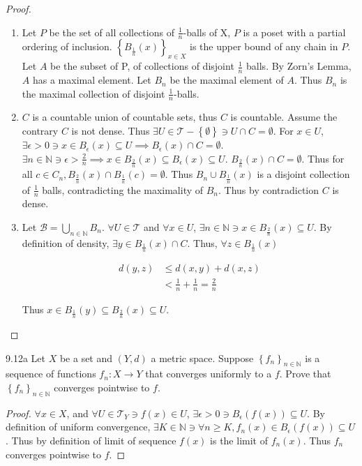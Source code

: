 \documentclass{article}
\newcommand*{\T}{\mathcal{T}}
\newcommand*{\B}{\mathcal{B}}
\newcommand*{\subeq}{\subseteq}
\newcommand*{\empset}{\emptyset}
\newcommand{\N}{\mathbb{N}}
\begin{document}
\begin{proof}
    \begin{enumerate}
        \item Let $P$ be the set of all collections of $\frac{1}{n}$-balls of X, $P$ is a poset with a partial ordering of inclusion. $\left\{ B_{\frac{1}{n}}(x) \right\}_{x \in X}$ is the upper bound of any chain in $P$. Let $A$ be the subset of P, of collections of disjoint $\frac{1}{n}$ balls. By Zorn's Lemma, $A$ has a maximal element. Let $B_n$ be the maximal element of $A$. Thus $B_n$ is the maximal collection of disjoint $\frac{1}{n}$-balls. 
        \item $C$ is a countable union of countable sets, thus $C$ is countable. Assume the contrary $C$ is not dense. Thus $\exists U \in \T - \left\{ \empset \right\}\ni U \cap C = \empset$. For $x \in U$, $\exists \epsilon > 0 \ni x \in B_{\epsilon}(x) \subeq U \implies B_{\epsilon}(x) \cap C = \empset$. $\exists n\in \N \ni \epsilon > \frac{2}{n} \implies x \in B_{\frac{2}{n}}(x) \subeq B_{\epsilon}(x) \subeq U$. $B_{\frac{2}{n}}(x) \cap C = \empset$. Thus for all $c \in C_n, B_{\frac{2}{n}}(x) \cap B_{\frac{1}{n}}(c) = \empset$. Thus $B_n \cup B_{\frac{1}{n}}(x)$ is a disjoint collection of $\frac{1}{n}$ balls, contradicting the maximality of $B_n$. Thus by contradiction $C$ is dense.       
        \item Let $\B = \bigcup_{n \in \N} B_n$. $\forall U \in \T$ and $\forall x \in U$, $\exists n \in \N \ni x \in B_{\frac{2}{n}}(x) \subeq U$. By definition of density, $\exists y \in B_{\frac{1}{n}}(x) \cap C$. Thus, $\forall z \in B_{\frac{1}{n}}(x)$ 
        
        \begin{align*}
            d(y, z) &\leq d(x, y) + d(x, z) \\
            &< \frac{1}{n} + \frac{1}{n} = \frac{2}{n}
        \end{align*}

        Thus $x \in B_{\frac{1}{n}}(y) \subeq B_{\frac{2}{n}}(x) \subeq U$. 
    \end{enumerate}
    
\end{proof}

\bigskip

\begin{claim}{9.12a}\label{Claim 9.12a.}
    Let $X$ be a set and $(Y, d)$ a metric space. Suppose $\left\{ f_n \right\}_{n \in \N}$ is a sequence of functions $f_n: X \to Y$ that converges uniformly to a $f$. Prove that $\left\{ f_n \right\}_{n \in \N}$ converges pointwise to $f$.        
\end{claim}
\begin{proof}
    $\forall x \in X$, and $\forall U \in \T_Y \ni f(x) \in U$, $\exists \epsilon > 0 \ni B_\epsilon(f(x)) \subeq U$. By definition of uniform convergence, $\exists K \in \N \ni \forall n \geq K, f_{n}(x) \in B_{\epsilon}(f(x)) \subeq U$. Thus by definition of limit of sequence $f(x)$ is the limit of $f_n(x)$. Thus $f_n$ converges pointwise to $f$.            
\end{proof}
\end{document}
